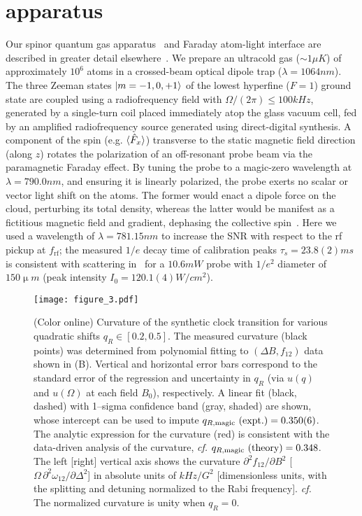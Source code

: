 \documentclass[aps,prl,reprint,superscriptaddress,floatfix]{revtex4-1}
\begin{document}
\section{apparatus}
\label{sec:apparatus}
Our spinor quantum gas apparatus~\cite{wood_magnetic_2015} and Faraday atom-light interface are described in greater detail elsewhere~\cite{jasperse_magic-wavelength_2017}.
We prepare an ultracold gas ($\sim1\unit{\mu K}$) of approximately $10^6$ \Rb atoms in a crossed-beam optical dipole trap ($\lambda=1064\unit{nm}$).
The three Zeeman states $\vert m=-1,0,+1 \rangle $ of the lowest hyperfine ($F=1$) ground state are coupled using a radiofrequency field with $\Omega/(2\pi) \leq 100\unit{kHz}$, generated by a single-turn coil placed immediately atop the glass vacuum cell, fed by an amplified radiofrequency source generated using direct-digital synthesis.
A component of the spin (e.g. $\langle \hat{F}_x \rangle$) transverse to the static magnetic field direction (along $z$) rotates the polarization of an off-resonant probe beam via the paramagnetic Faraday effect.
By tuning the probe to a magic-zero wavelength at $\lambda = 790.0\unit{nm}$, and ensuring it is linearly polarized, the probe exerts no scalar or vector light shift on the atoms.
The former would enact a dipole force on the cloud, perturbing its total density, whereas the latter would be manifest as a fictitious magnetic field and gradient, dephasing the collective spin~\cite{wood_measurement_2016}.
Here we used a wavelength of $\lambda=781.15\unit{nm}$ to increase the SNR with respect to the rf pickup at $f_{\text{rf}}$; the measured $1/e$ decay time of calibration peaks $\tau_s = 23.8(2)\unit{ms}$ is consistent with scattering in~\cite{jasperse_magic-wavelength_2017} for a $10.6\unit{mW}$ probe with $1/e^2$ diameter of $150\unit{\upmu m}$ (peak intensity $I_0 = 120.1(4)\unit{W/cm^2}$).


\begin{figure}
    \centering
    \texttt{[image: figure\_3.pdf]}
    \caption{
    \label{fig:curvature_vs_qR}
        (Color online)
        Curvature of the synthetic clock transition for various quadratic shifts $q_R \in [0.2, 0.5]$.
        The measured curvature (black points) was determined from polynomial fitting to $(\Delta B, f_{12})$ data shown in (B).
        Vertical and horizontal error bars correspond to the standard error of the regression and uncertainty in $q_R$ (via $u(q)$ and $u(\Omega)$ at each field $B_0$), respectively.
        A linear fit (black, dashed) with 1--sigma confidence band (gray, shaded) are shown, whose intercept can be used to impute $q_{R,\text{magic}}\text{ (expt.)} = 0.350(6)$.
        The analytic expression for the curvature (red) is consistent with the data-driven analysis of the curvature, \emph{cf.} $q_{R,\text{magic}}\text{ (theory)} = 0.348$.
        The left [right] vertical axis shows the curvature $\partial^2 f_{12}/\partial B^2$ [$\Omega\, \partial^2\omega_{12}/\partial \Delta^2$] in absolute units of $\unit{kHz/G^2}$ [dimensionless units, with the splitting and detuning normalized to the Rabi frequency].
      \emph{cf.} The normalized curvature is unity when $q_R=0$.
    }
\end{figure}
\end{document}
